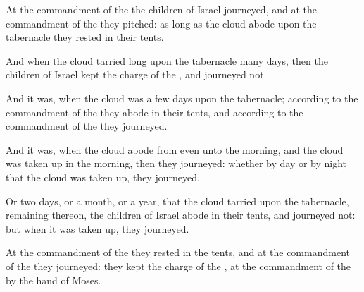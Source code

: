 {At the
commandment of the
{} the
children of
Israel
journeyed, and at the
commandment of the
{} they
pitched: as long
as the
cloud
abode upon the
tabernacle they
rested in their tents.

And when the
cloud tarried
long upon the
tabernacle
many
days, then the
children of
Israel
kept the
charge of the
{}, and
journeyed not.

And
{} it
was, when the
cloud was a
few
days upon the
tabernacle; according to the
commandment of the
{} they
abode in their tents, and according to the
commandment of the
{} they
journeyed.

And
{} it
was, when the
cloud abode from
even unto the
morning, and
{} the
cloud was taken
up in the
morning, then they
journeyed: whether
{} by
day or by
night that the
cloud was taken
up, they
journeyed.

Or
{} two
days, or a
month, or a
year, that the
cloud
tarried upon the
tabernacle,
remaining thereon, the
children of
Israel
abode in their tents, and
journeyed not: but when it was taken
up, they
journeyed.

At the
commandment of the
{} they
rested in the tents, and at the
commandment of the
{} they
journeyed: they
kept the
charge of the
{}, at the
commandment of the
{} by the
hand of
Moses.




\par }
